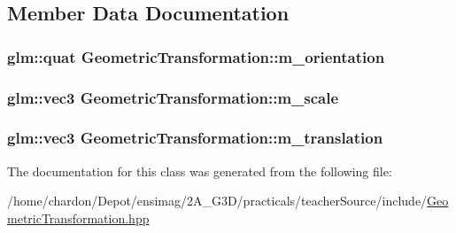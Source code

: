 \subsection{Member Data Documentation}
\hypertarget{classGeometricTransformation_a9ca739f24f14669c8345c08e15f12488}{
\subsubsection[{m\+\_\+orientation}]{\setlength{\rightskip}{0pt plus 5cm}glm\+::quat Geometric\+Transformation\+::m\+\_\+orientation\hspace{0.3cm}{\ttfamily [private]}}}\label{classGeometricTransformation_a9ca739f24f14669c8345c08e15f12488}
\hypertarget{classGeometricTransformation_ae5cd66123221556e3cfecab07b84339f}{
\subsubsection[{m\+\_\+scale}]{\setlength{\rightskip}{0pt plus 5cm}glm\+::vec3 Geometric\+Transformation\+::m\+\_\+scale\hspace{0.3cm}{\ttfamily [private]}}}\label{classGeometricTransformation_ae5cd66123221556e3cfecab07b84339f}
\hypertarget{classGeometricTransformation_a8642aa96a78adfdd279b5c4e1d7ee8db}{
\subsubsection[{m\+\_\+translation}]{\setlength{\rightskip}{0pt plus 5cm}glm\+::vec3 Geometric\+Transformation\+::m\+\_\+translation\hspace{0.3cm}{\ttfamily [private]}}}\label{classGeometricTransformation_a8642aa96a78adfdd279b5c4e1d7ee8db}


The documentation for this class was generated from the following file\+:\begin{DoxyCompactItemize}
\item 
/home/chardon/\+Depot/ensimag/2\+A\+\_\+\+G3\+D/practicals/teacher\+Source/include/\hyperlink{GeometricTransformation_8hpp}{Geometric\+Transformation.\+hpp}\end{DoxyCompactItemize}
